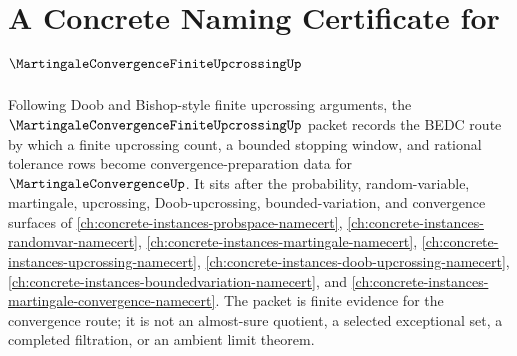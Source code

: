 \chapter{A Concrete Naming Certificate for $\MartingaleConvergenceFiniteUpcrossingUp$}
\label{ch:concrete-instances-martingale-convergence-finite-upcrossing-namecert}

Following Doob and Bishop-style finite upcrossing arguments, the
$\MartingaleConvergenceFiniteUpcrossingUp$ packet records the BEDC route by
which a finite upcrossing count, a bounded stopping window, and rational
tolerance rows become convergence-preparation data for
$\MartingaleConvergenceUp$. It sits after the probability, random-variable,
martingale, upcrossing, Doob-upcrossing, bounded-variation, and convergence
surfaces of \autoref{ch:concrete-instances-probspace-namecert},
\autoref{ch:concrete-instances-randomvar-namecert},
\autoref{ch:concrete-instances-martingale-namecert},
\autoref{ch:concrete-instances-upcrossing-namecert},
\autoref{ch:concrete-instances-doob-upcrossing-namecert},
\autoref{ch:concrete-instances-boundedvariation-namecert}, and
\autoref{ch:concrete-instances-martingale-convergence-namecert}. The packet is
finite evidence for the convergence route; it is not an almost-sure quotient, a
selected exceptional set, a completed filtration, or an ambient limit theorem.

